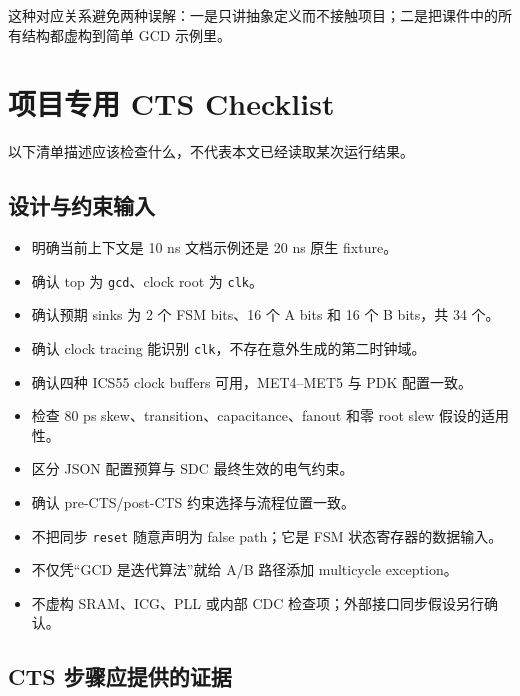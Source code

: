 \documentclass[UTF8,a4paper,11pt,fontset=fandol]{ctexart}
\newcommand{\code}[1]{\nolinkurl{#1}}
\begin{document}
这种对应关系避免两种误解：一是只讲抽象定义而不接触项目；二是把课件中的所有结构都虚构到简单 GCD 示例里。

\section{项目专用 CTS Checklist}

以下清单描述应该检查什么，不代表本文已经读取某次运行结果。

\subsection{设计与约束输入}

\begin{itemize}[leftmargin=2em]
  \item[$\square$] 明确当前上下文是 10 ns 文档示例还是 20 ns 原生 fixture。
  \item[$\square$] 确认 top 为 \code{gcd}、clock root 为 \code{clk}。
  \item[$\square$] 确认预期 sinks 为 2 个 FSM bits、16 个 A bits 和 16 个 B bits，共 34 个。
  \item[$\square$] 确认 clock tracing 能识别 \code{clk}，不存在意外生成的第二时钟域。
  \item[$\square$] 确认四种 ICS55 clock buffers 可用，MET4--MET5 与 PDK 配置一致。
  \item[$\square$] 检查 80 ps skew、transition、capacitance、fanout 和零 root slew 假设的适用性。
  \item[$\square$] 区分 JSON 配置预算与 SDC 最终生效的电气约束。
  \item[$\square$] 确认 pre-CTS/post-CTS 约束选择与流程位置一致。
  \item[$\square$] 不把同步 \code{reset} 随意声明为 false path；它是 FSM 状态寄存器的数据输入。
  \item[$\square$] 不仅凭“GCD 是迭代算法”就给 A/B 路径添加 multicycle exception。
  \item[$\square$] 不虚构 SRAM、ICG、PLL 或内部 CDC 检查项；外部接口同步假设另行确认。
\end{itemize}

\subsection{CTS 步骤应提供的证据}
\end{document}
